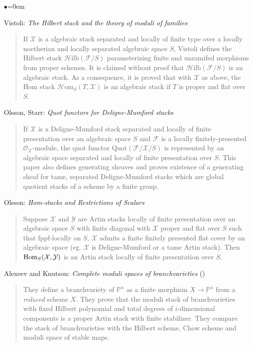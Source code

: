 \begin{list}{$\bullet$}{\leftmargin=0em}
\item Vistoli: \emph{The Hilbert stack and the theory of moduli of families}
\cite{vistoli_hilbert}
\begin{quote}
If $\mathcal{X}$ is a algebraic stack separated and locally of finite type
over a locally noetherian and locally separated algebraic space $S$, Vistoli
defines the Hilbert stack $\mathcal{H}\text{ilb}(\mathcal{F} / S)$
parameterizing finite and unramifed morphisms from proper schemes.
It is claimed without proof that $\mathcal{H}\text{ilb}(\mathcal{F} / S)$
is an algebraic stack.  As a consequence, it is proved that with $\mathcal{X}$
as above, the Hom stack $\mathcal{H} \text{om}_S(T, \mathcal{X})$ is an
algebraic stack if $T$ is proper and flat over $S$.     
\end{quote}
\smallskip
\item Olsson, Starr: \emph{Quot functors for Deligne-Mumford stacks}
\cite{olsson-starr}
\begin{quote}
If $\mathcal{X}$ is a Deligne-Mumford stack separated and locally of finite
presentation over an algebraic space $S$ and $\mathcal{F}$ is a locally
finitely-presented $\mathcal{O}_{\mathcal{X}}$-module, the quot functor
$\text{Quot}(\mathcal{F} / \mathcal{X} / S)$ is represented by an algebraic
space separated and locally of finite presentation over $S$.  This paper
also defines generating sheaves and proves existence of a generating sheaf
for tame, separated Deligne-Mumford stacks which are global quotient stacks
of a scheme by a finite group.  
\end{quote}
\smallskip

\item Olsson: \emph{Hom-stacks and Restrictions of Scalars}
\cite{olsson_homstacks}
\begin{quote}
Suppose $\mathcal{X}$ and $\mathcal{Y}$ are Artin stacks locally of finite
presentation over an algebraic space $S$ with finite diagonal with
$\mathcal{X}$ proper and flat over $S$ such that fppf-locally on $S$,
$\mathcal{X}$ admits a finite finitely presented flat cover by an algebraic
space (eg. $\mathcal{X}$ is Deligne-Mumford or a tame Artin stack).
Then $\mathop{\rm Hom}\nolimits_S(\mathcal{X}, \mathcal{Y})$ is an Artin stack locally
of finite presentation over $S$.
\end{quote}
\smallskip

\item Alexeev and Knutson:  \emph{Complete moduli spaces of branchvarieties}
(\cite{alexeev-knutson})
\begin{quote}
They define a branchvariety of $\mathbb{P}^n$ as a finite morphism
$X \rightarrow \mathbb{P}^n$ from a \emph{reduced} scheme $X$.  They prove
that the moduli stack of branchvarieties with fixed Hilbert polynomial and
total degrees of $i$-dimensional components is a proper Artin stack with
finite stabilizer.  They compare the stack of branchvarieties with the
Hilbert scheme, Chow scheme and moduli space of stable maps.
\end{quote}
\smallskip


\end{list}
